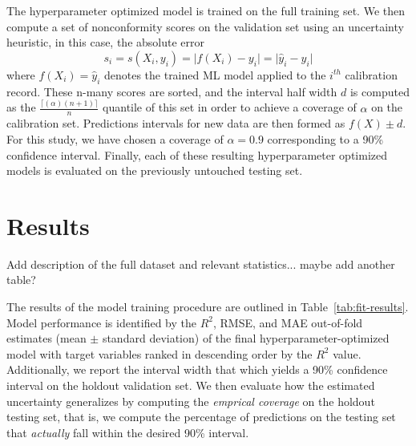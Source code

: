 \documentclass[journal,article,submit,pdftex,moreauthors]{Definitions/mdpi}
\begin{document}
The hyperparameter optimized model is trained on the full training set. We then compute a set of nonconformity scores on the validation set using an uncertainty heuristic, in this case, the absolute error
\begin{equation}
    s_i = s(X_i, y_i) = \lvert f(X_i) - y_i \rvert = \lvert \hat{y}_i - y_i \rvert
\end{equation}
where $f(X_i)=\hat{y}_i$ denotes the trained ML model applied to the $i^{th}$ calibration record. These n-many scores are sorted, and the interval half width $d$ is computed as the $\frac{\lceil(\alpha)(n+1) \rceil}{n}$ quantile of this set in order to achieve a coverage of $\alpha$ on the calibration set. Predictions intervals for new data are then formed as $f(X)\pm d$. For this study, we have chosen a coverage of $\alpha=0.9$ corresponding to a 90\% confidence interval. Finally, each of these resulting hyperparameter optimized models is evaluated on the previously untouched testing set.


\section{Results}

Add description of the full dataset and relevant statistics... maybe add another table? 


The results of the model training procedure are outlined in Table~\ref{tab:fit-results}. Model performance is identified by the $R^2$, RMSE, and MAE out-of-fold estimates (mean $\pm$ standard deviation) of the final hyperparameter-optimized model with target variables ranked in descending order by the $R^2$ value. Additionally, we report the interval width that which yields a 90\% confidence interval on the holdout validation set. We then evaluate how the estimated uncertainty generalizes by computing the \textit{emprical coverage} on the holdout testing set, that is, we compute the percentage of predictions on the testing set that \textit{actually} fall within the desired 90\% interval. 
\end{document}
